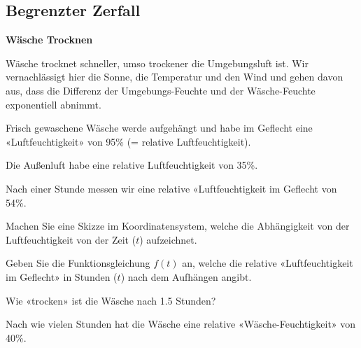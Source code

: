 
\subsection{Begrenzter Zerfall}
\bbwActAufgabenNr{} \textbf{Wäsche Trocknen}

Wäsche trocknet schneller, umso trockener die Umgebungsluft ist. Wir
vernachlässigt hier die Sonne, die Temperatur und den Wind und gehen
davon aus, dass die Differenz der Umgebungs-Feuchte und der
Wäsche-Feuchte exponentiell abnimmt.

Frisch gewaschene Wäsche werde aufgehängt und habe im Geflecht eine «Luftfeuchtigkeit» von 95\%
(= relative Luftfeuchtigkeit).

Die Außenluft habe eine relative Luftfeuchtigkeit von 35\%. 


Nach einer
Stunde messen wir eine relative «Luftfeuchtigkeit im Geflecht von
54\%.


\begin{bbwAufgabenBlock}
\item Machen Sie eine Skizze im Koordinatensystem, welche die
Abhängigkeit von der Luftfeuchtigkeit von der Zeit ($t$) aufzeichnet.


\item Geben Sie die Funktionsgleichung $f(t)$ an, welche die relative
«Luftfeuchtigkeit im Geflecht» in Stunden ($t$) nach dem Aufhängen
angibt.


\item Wie «trocken» ist die Wäsche nach 1.5 Stunden?


\item Nach wie vielen Stunden hat die Wäsche eine relative
«Wäsche-Feuchtigkeit» von 40\%.


\TRAINER{

$$f(t) = 35 + 60 \cdot \left( \frac{19}{60}\right)^t$$
$f(t) = 40[\%]$ einsetzen:

$$40 [\%| = 35 + 60 \cdot \left( \frac{19}{60}\right)^t$$
$$5 [\%| = 60 \cdot \left( \frac{19}{60}\right)^t$$
$$\frac5{60} [\%| =\left( \frac{19}{60}\right)^t$$
$$t = \log_{\frac{19}{60}}(\frac5{60}) \approx 2.16 [\textrm{h}]$$
}%

\end{bbwAufgabenBlock}


